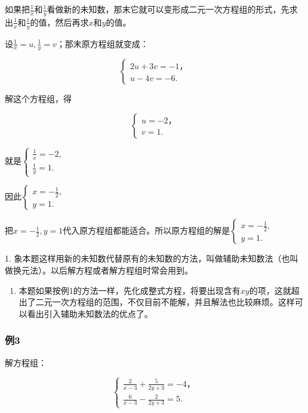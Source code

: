 如果把\(\frac{1}{x}\)和\(\frac{1}{y}\)看做新的未知数，那末它就可以变形成二元一次方程组的形式，先求出\(\frac{1}{x}\)和\(\frac{1}{y}\)的值，然后再求\(x\)和\(y\)的值。

设\(\frac{1}{x} = u, \frac{1}{y} = v\)；那末原方程组就变成：

\[
\left\{ \begin{array}{l} 2 u + 3 v = - 1\text{，} \\ u - 4 v = - 6. \end{array} \right. \tag{3}
\]

解这个方程组，得

\[
\left\{ \begin{array}{l} u = - 2\text{，} \\ v = 1. \end{array} \right.
\]

就是\(\left\{ \begin{array}{l} \frac{1}{x} = -2, \\ \frac{1}{y} = 1. \end{array} \right.\)

因此\(\left\{ \begin{array}{l} x = -\frac{1}{2}, \\ y = 1. \end{array} \right.\)

把\(x = -\frac{1}{2}, y = 1\)代入原方程组都能适合。所以原方程组的解是\(\left\{ \begin{array}{l} x = -\frac{1}{2}, \\ y = 1. \end{array} \right.\)

 1.
象本题这样用新的未知数代替原有的未知数的方法，叫做辅助未知数法（也叫做换元法）。以后解方程或者解方程组时常会用到。

\begin{enumerate}[start=2]
\item
  本题如果按例1的方法一样，先化成整式方程，将要出现含有\(xy\)的项，这就超出了二元一次方程组的范围，不仅目前不能解，并且解法也比较麻烦。这样可以看出引入辅助未知数法的优点了。
\end{enumerate}

\subsubsection{例3}

解方程组：

\[
\left\{ \begin{array}{l} \frac{2}{x - 3} + \frac{5}{2 y + 3} = - 4\text{，} \\ \frac{6}{x - 3} - \frac{2}{2 y + 3} = 5. \end{array} \right. \tag{1}
\]

